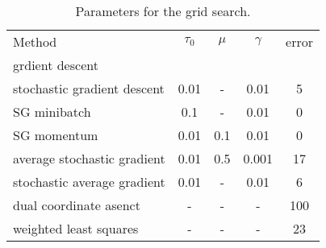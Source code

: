 \documentclass{article}
\begin{document}
\begin{table}[h]
	\centering
	\begin{tabular}{l c c c c}
		Method				& $\tau_0$ & $\mu$& $\gamma$ & error \\	
		grdient descent			&	   & 	  & &	\\
		stochastic gradient descent	& 0.01	   & - 	  & 0.01     & 5     \\
	 	SG minibatch 			& 0.1	   & -	  & 0.01     & 0     \\
		SG momentum			& 0.01	   & 0.1  & 0.01     & 0     \\
		average stochastic gradient	& 0.01     &0.5   & 0.001    & 17    \\	
		stochastic average gradient	& 0.01	   &  -   & 0.01     & 6     \\
		dual coordinate asenct		& -	   &  -   &   -	     & 100   \\
		weighted least squares		& -        &  -   &   -      & 23    \\
	\end{tabular}
	\caption{Parameters for the grid search.}
	\label{tab1}
\end{table}
\end{document}
